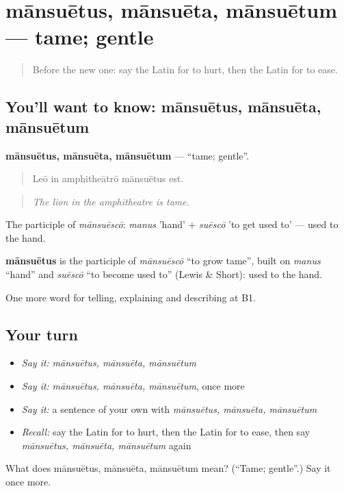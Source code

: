\section[mānsuētus, mānsuēta, mānsuētum]{mānsuētus, mānsuēta, mānsuētum — tame; gentle}

\label{lesson:LA-C511-mansuetus}



\begin{quote}
Before the new one: say the Latin for to hurt, then the Latin for to ease.
\end{quote}

\subsection*{You'll want to know: mānsuētus, mānsuēta, mānsuētum}
\textbf{mānsuētus, mānsuēta, mānsuētum} — \textquotedblleft{}tame; gentle\textquotedblright{}.

\begin{quote}
Leō in amphitheātrō mānsuētus est.
\end{quote}

\begin{quote}
\emph{The lion in the amphitheatre is tame.}
\end{quote}

The participle of \emph{mānsuēscō}: \emph{manus} 'hand' + \emph{suēscō} 'to get used to' — used to the hand.

\begin{cousinweb}
\textbf{mānsuētus} is the participle of \emph{mānsuēscō} \textquotedblleft{}to grow tame\textquotedblright{}, built on \emph{manus} \textquotedblleft{}hand\textquotedblright{} and \emph{suēscō} \textquotedblleft{}to become used to\textquotedblright{} (Lewis \& Short): used to the hand.
\end{cousinweb}

\begin{grammarlens}[title={What you've built}]
One more word for telling, explaining and describing at B1.
\end{grammarlens}

\subsection*{Your turn}
\begin{itemize}
\raggedright
  \item \emph{Say it:} \emph{mānsuētus, mānsuēta, mānsuētum}
  \item \emph{Say it:} \emph{mānsuētus, mānsuēta, mānsuētum}, once more
  \item \emph{Say it:} a sentence of your own with \emph{mānsuētus, mānsuēta, mānsuētum}
  \item \emph{Recall:} say the Latin for to hurt, then the Latin for to ease, then say \emph{mānsuētus, mānsuēta, mānsuētum} again
\end{itemize}

\begin{tcolorbox}[breakable,colback=teal!4,colframe=teal!35!black,title={Before you move on}]
What does mānsuētus, mānsuēta, mānsuētum mean? (\textquotedblleft{}Tame; gentle\textquotedblright{}.) Say it once more.
\end{tcolorbox}
